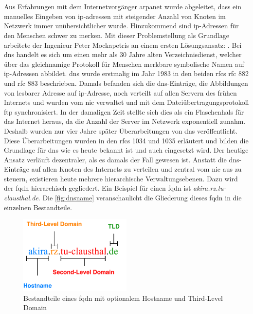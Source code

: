 \documentclass[titlepage]{report}
\begin{document}
\section*{}
Aus Erfahrungen mit dem Internetvorgänger \gls{arpanet} wurde
abgeleitet, dass ein manuelles Eingeben von \gls{ip}\hyp{}adressen mit
steigender Anzahl von Knoten im Netzwerk immer unübersichtlicher wurde.
Hinzukommend sind \gls{ip}\hyp{}Adressen für den Menschen schwer zu
merken. Mit dieser Problemstellung als Grundlage arbeitete der Ingenieur
Peter Mockapetris an einem ersten Lösungsansatz: .
Bei \gls{dns} handelt es sich um einen mehr als 30 Jahre alten
Verzeichnisdienst, welcher über das gleichnamige Protokoll für Menschen
merkbare symbolische Namen auf \gls{ip}\hyp{}Adressen abbildet.
\gls{dns} wurde erstmalig im Jahr 1983 in den beiden \glspl{rfc}
\gls{rfc} 882\cite{RFC0882} und \gls{rfc} 883\cite{RFC0883} beschrieben.
Damals befanden sich die \gls{dns}\hyp{}Einträge, die Abbildungen von
lesbarer Adresse auf \gls{ip}\hyp{}Adresse, noch verteilt auf
allen Servern des frühen Internets und wurden vom \gls{nic} verwaltet
und mit dem Dateiübertragungsprotokoll \gls{ftp}
synchronisiert\cite{RFC1034}. In der damaligen Zeit stellte sich dies
als ein Flaschenhals für das Internet heraus, da die Anzahl der Server
im Netzwerk exponentiell zunahm. Deshalb wurden nur vier Jahre später
Überarbeitungen von \gls{dns} veröffentlicht. Diese Überarbeitungen
wurden in den \glspl{rfc} 1034 und 1035 erläutert
und bilden die Grundlage für \gls{dns} wie es heute bekannt ist und auch
eingesetzt wird. Der heutige Ansatz verläuft dezentraler, als es damals
der Fall gewesen ist. Anstatt die \gls{dns}\hyp{}Einträge auf allen
Knoten des Internets zu verteilen und zentral vom \gls{nic} aus zu
steuern, existieren heute mehrere hierarchische Verwaltungsebenen. Dazu
wird der \gls{fqdn} hierarchisch gegliedert. Ein Beispiel für einen
\gls{fqdn} ist \emph{akira.rz.tu-clausthal.de}. Die
\autoref{fig:dnsname} veranschaulicht die Gliederung dieses \gls{fqdn} in die
einzelnen Bestandteile.
\begin{figure}[H]
    \centering
    \includegraphics[width=0.5\textwidth]{figures/dnsname.pdf}
    \caption{Bestandteile eines \gls{fqdn} mit optionalem Hostname und Third-Level
    Domain}\label{fig:dnsname}
\end{figure}
\end{document}
